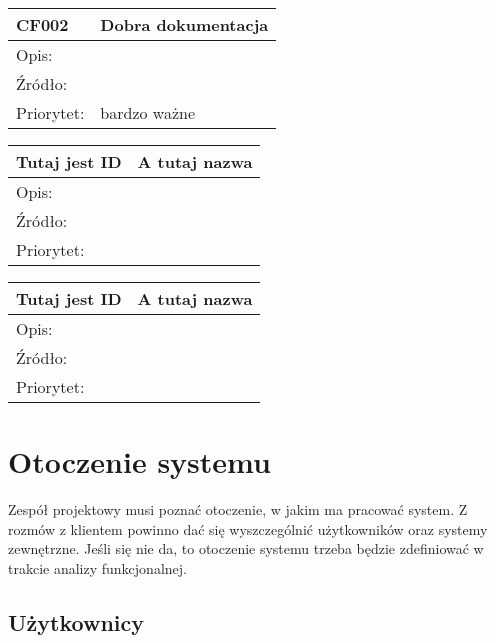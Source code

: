 \documentclass[a4paper,10pt]{article}
\begin{document}
\begin{center}
\begin{tabular}{|l|l|} \hline

CF002 & Dobra dokumentacja \\ \hline
Opis: &  \\ \hline
Źródło: &  \\ \hline
Priorytet: & bardzo ważne \\ \hline

\end{tabular}
\end{center}

\begin{center}
\begin{tabular}{|l|l|} \hline

Tutaj jest ID & A tutaj nazwa \\ \hline
Opis: &  \\ \hline
Źródło: &  \\ \hline
Priorytet: &  \\ \hline

\end{tabular}
\end{center}

\begin{center}
\begin{tabular}{|l|l|} \hline

Tutaj jest ID & A tutaj nazwa \\ \hline
Opis: &  \\ \hline
Źródło: &  \\ \hline
Priorytet: &  \\ \hline

\end{tabular}
\end{center}


\section{Otoczenie systemu}

Zespół projektowy musi poznać otoczenie, w jakim ma pracować system. Z rozmów z klientem powinno dać się wyszczególnić użytkowników oraz systemy zewnętrzne. Jeśli się nie da, to otoczenie systemu trzeba będzie zdefiniować w trakcie analizy funkcjonalnej.

\subsection{Użytkownicy}
\end{document}
